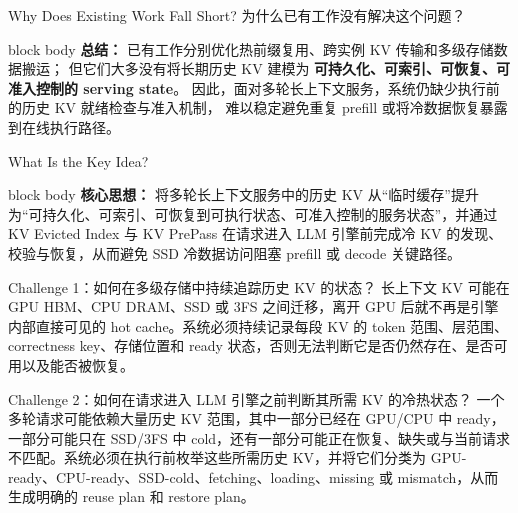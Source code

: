 \documentclass[aspectratio=169,10pt]{beamer}
\begin{document}
\begin{frame}[t]{Why Does Existing Work Fall Short? 为什么已有工作没有解决这个问题？}
\vspace{0.35em}
\begin{beamercolorbox}[wd=\linewidth,sep=0.5em,rounded=true]{block body}
\textbf{\textcolor{AccentRed}{总结：}}
已有工作分别优化热前缀复用、跨实例 KV 传输和多级存储数据搬运；
但它们大多没有将长期历史 KV 建模为
\textbf{可持久化、可索引、可恢复、可准入控制的 serving state}。
因此，面对多轮长上下文服务，系统仍缺少执行前的历史 KV 就绪检查与准入机制，
难以稳定避免重复 prefill 或将冷数据恢复暴露到在线执行路径。
\end{beamercolorbox}

\end{frame}

\begin{frame}[t]{What Is the Key Idea?}
\small
\vspace{-0.45em}

\begin{beamercolorbox}[wd=\linewidth,sep=0.55em,rounded=true]{block body}
\textbf{\textcolor{MainBlue}{核心思想：}}
将多轮长上下文服务中的历史 KV 从“临时缓存”提升为“可持久化、可索引、可恢复到可执行状态、可准入控制的服务状态”，并通过 KV Evicted Index 与 KV PrePass 在请求进入 LLM 引擎前完成冷 KV 的发现、校验与恢复，从而避免 SSD 冷数据访问阻塞 prefill 或 decode 关键路径。
\end{beamercolorbox}

\vspace{0.35em}

\begin{block}{Challenge 1：如何在多级存储中持续追踪历史 KV 的状态？}
长上下文 KV 可能在 GPU HBM、CPU DRAM、SSD 或 3FS 之间迁移，离开 GPU 后就不再是引擎内部直接可见的 hot cache。系统必须持续记录每段 KV 的 token 范围、层范围、correctness key、存储位置和 ready 状态，否则无法判断它是否仍然存在、是否可用以及能否被恢复。
\end{block}

\vspace{0.35em}

\begin{block}{Challenge 2：如何在请求进入 LLM 引擎之前判断其所需 KV 的冷热状态？}
一个多轮请求可能依赖大量历史 KV 范围，其中一部分已经在 GPU/CPU 中 ready，一部分可能只在 SSD/3FS 中 cold，还有一部分可能正在恢复、缺失或与当前请求不匹配。系统必须在执行前枚举这些所需历史 KV，并将它们分类为 GPU-ready、CPU-ready、SSD-cold、fetching、loading、missing 或 mismatch，从而生成明确的 reuse plan 和 restore plan。
\end{block}


\end{frame}
\end{document}
